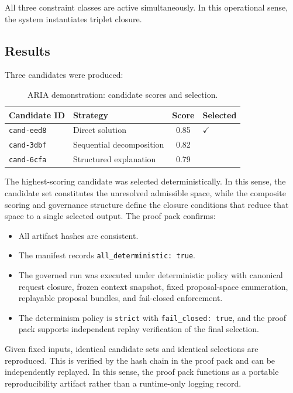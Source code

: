 \documentclass[12pt]{article}
\begin{document}
All three constraint classes are active simultaneously. In this operational sense, the system instantiates triplet closure.

\subsection{Results}

Three candidates were produced:
\begin{table}[ht]
\centering
\caption{ARIA demonstration: candidate scores and selection.}
\label{tab:aria}
\begin{tabular}{@{}llcl@{}}
\toprule
Candidate ID & Strategy & Score & Selected \\
\midrule
\texttt{cand-eed8} & Direct solution & 0.85 & $\checkmark$ \\
\texttt{cand-3dbf} & Sequential decomposition & 0.82 & \\
\texttt{cand-6cfa} & Structured explanation & 0.79 & \\
\bottomrule
\end{tabular}
\end{table}

The highest-scoring candidate was selected deterministically. In this sense, the candidate set constitutes the unresolved admissible space, while the composite scoring and governance structure define the closure conditions that reduce that space to a single selected output. The proof pack confirms:
\begin{itemize}
    \item All artifact hashes are consistent.
    \item The manifest records \texttt{all\_deterministic: true}.
    \item The governed run was executed under deterministic policy with canonical request closure, frozen context snapshot, fixed proposal-space enumeration, replayable proposal bundles, and fail-closed enforcement.
    \item The determinism policy is \texttt{strict} with \texttt{fail\_closed: true}, and the proof pack supports independent replay verification of the final selection.
\end{itemize}

Given fixed inputs, identical candidate sets and identical selections are reproduced. This is verified by the hash chain in the proof pack and can be independently replayed. In this sense, the proof pack functions as a portable reproducibility artifact rather than a runtime-only logging record.
\end{document}
